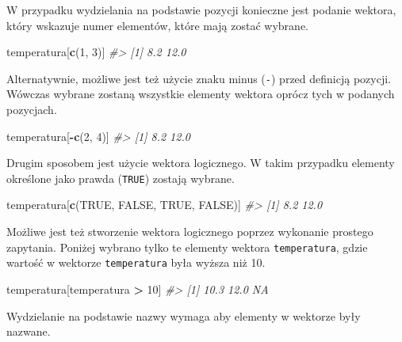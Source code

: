 \documentclass[paper=6in:9in,pagesize=pdftex,headinclude=on,footinclude=on,10pt]{scrbook}
\newenvironment{Shaded}{\begin{snugshade}}{\end{snugshade}}
\newcommand{\CommentTok}[1]{\textcolor[rgb]{0.56,0.35,0.01}{\textit{#1}}}
\newcommand{\DecValTok}[1]{\textcolor[rgb]{0.00,0.00,0.81}{#1}}
\newcommand{\KeywordTok}[1]{\textcolor[rgb]{0.13,0.29,0.53}{\textbf{#1}}}
\newcommand{\NormalTok}[1]{#1}
\newcommand{\OperatorTok}[1]{\textcolor[rgb]{0.81,0.36,0.00}{\textbf{#1}}}
\newcommand{\OtherTok}[1]{\textcolor[rgb]{0.56,0.35,0.01}{#1}}
\newcommand{\StringTok}[1]{\textcolor[rgb]{0.31,0.60,0.02}{#1}}
\begin{document}
W przypadku wydzielania na podstawie pozycji konieczne jest podanie wektora, który wskazuje numer elementów, które mają zostać wybrane.

\begin{Shaded}
\begin{Highlighting}[]
\NormalTok{temperatura[}\KeywordTok{c}\NormalTok{(}\DecValTok{1}\NormalTok{, }\DecValTok{3}\NormalTok{)]}
\CommentTok{#> [1]  8.2 12.0}
\end{Highlighting}
\end{Shaded}

Alternatywnie, możliwe jest też użycie znaku minus (\texttt{-}) przed definicją pozycji.
Wówczas wybrane zostaną wszystkie elementy wektora oprócz tych w podanych pozycjach.

\begin{Shaded}
\begin{Highlighting}[]
\NormalTok{temperatura[}\OperatorTok{-}\KeywordTok{c}\NormalTok{(}\DecValTok{2}\NormalTok{, }\DecValTok{4}\NormalTok{)]}
\CommentTok{#> [1]  8.2 12.0}
\end{Highlighting}
\end{Shaded}

Drugim sposobem jest użycie wektora logicznego.
W takim przypadku elementy określone jako prawda (\texttt{TRUE}) zostają wybrane.

\begin{Shaded}
\begin{Highlighting}[]
\NormalTok{temperatura[}\KeywordTok{c}\NormalTok{(}\OtherTok{TRUE}\NormalTok{, }\OtherTok{FALSE}\NormalTok{, }\OtherTok{TRUE}\NormalTok{, }\OtherTok{FALSE}\NormalTok{)]}
\CommentTok{#> [1]  8.2 12.0}
\end{Highlighting}
\end{Shaded}

Możliwe jest też stworzenie wektora logicznego poprzez wykonanie prostego zapytania.
Poniżej wybrano tylko te elementy wektora \texttt{temperatura}, gdzie wartość w wektorze \texttt{temperatura} była wyższa niż 10.

\begin{Shaded}
\begin{Highlighting}[]
\NormalTok{temperatura[temperatura }\OperatorTok{>}\StringTok{ }\DecValTok{10}\NormalTok{]}
\CommentTok{#> [1] 10.3 12.0   NA}
\end{Highlighting}
\end{Shaded}

Wydzielanie na podstawie nazwy wymaga aby elementy w wektorze były nazwane.
\end{document}
